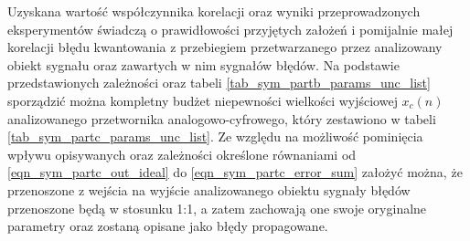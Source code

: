 Uzyskana wartość współczynnika korelacji oraz wyniki przeprowadzonych eksperymentów świadczą o prawidłowości przyjętych założeń i pomijalnie małej korelacji błędu kwantowania z przebiegiem przetwarzanego przez analizowany obiekt sygnału oraz zawartych w nim sygnałów błędów. Na podstawie przedstawionych zależności oraz tabeli \ref{tab_sym_partb_params_unc_list} sporządzić można kompletny budżet niepewności wielkości wyjściowej $x_{c}(n)$ analizowanego przetwornika analogowo-cyfrowego, który zestawiono w tabeli \ref{tab_sym_partc_params_unc_list}. Ze względu na możliwość pominięcia wpływu opisywanych oraz zależności określone równaniami od \eqref{eqn_sym_partc_out_ideal} do \eqref{eqn_sym_partc_error_sum} założyć można, że przenoszone z wejścia na wyjście analizowanego obiektu sygnały błędów przenoszone będą w stosunku 1:1, a zatem zachowają one swoje oryginalne parametry oraz zostaną opisane jako błędy propagowane.

